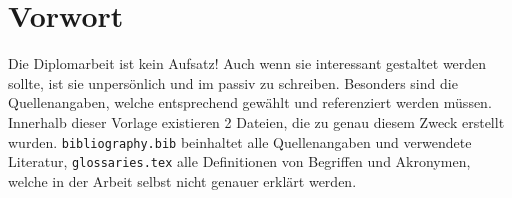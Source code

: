 \chapter{Vorwort}
Die Diplomarbeit ist kein Aufsatz!
Auch wenn sie interessant gestaltet werden sollte, ist sie unpersönlich und im passiv zu schreiben.
Besonders sind die Quellenangaben, welche entsprechend gewählt und referenziert werden müssen.
Innerhalb dieser Vorlage existieren 2 Dateien, die zu genau diesem Zweck erstellt wurden. \texttt{bibliography.bib} beinhaltet alle Quellenangaben und verwendete Literatur, \texttt{glossaries.tex} alle Definitionen von Begriffen und Akronymen, welche in der Arbeit selbst nicht genauer erklärt werden.

